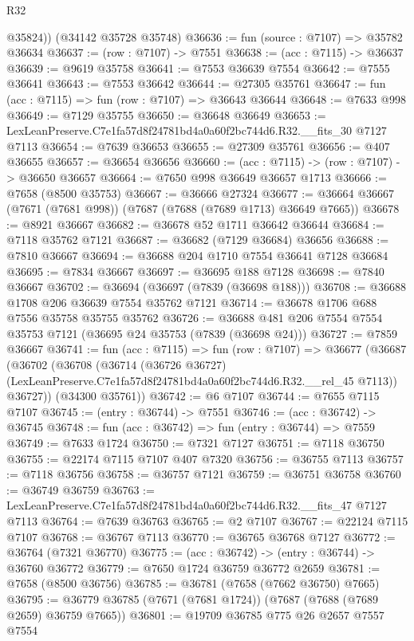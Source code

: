 \begin{lexlean}{R32}
\begin{coremodule}
        @35824))
    (@34142 @35728 @35748)
@36636 := fun (source : @7107) => @35782 @36634
@36637 := (row : @7107) -> @7551
@36638 := (acc : @7115) -> @36637
@36639 := @9619 @35758
@36641 := @7553 @36639 @7554
@36642 := @7555 @36641
@36643 := @7553 @36642
@36644 := @27305 @35761
@36647 := fun (acc : @7115) => fun (row : @7107) => @36643 @36644
@36648 := @7633 @998
@36649 := @7129 @35755
@36650 := @36648 @36649
@36653 := LexLeanPreserve.C7e1fa57d8f24781bd4a0a60f2bc744d6.R32.__fits_30 @7127 @7113
@36654 := @7639 @36653
@36655 := @27309 @35761
@36656 := @407 @36655
@36657 := @36654 @36656
@36660 := (acc : @7115) -> (row : @7107) -> @36650 @36657
@36664 := @7650 @998 @36649 @36657 @1713
@36666 := @7658 (@8500 @35753)
@36667 := @36666 @27324
@36677 := @36664 @36667 (@7671 (@7681 @998)) (@7687 (@7688 (@7689 @1713) @36649 @7665))
@36678 := @8921 @36667
@36682 := @36678 @52 @1711 @36642 @36644
@36684 := @7118 @35762 @7121
@36687 := @36682 (@7129 @36684) @36656
@36688 := @7810 @36667
@36694 := @36688 @204 @1710 @7554 @36641 @7128 @36684
@36695 := @7834 @36667
@36697 := @36695 @188 @7128
@36698 := @7840 @36667
@36702 := @36694 (@36697 (@7839 (@36698 @188)))
@36708 := @36688 @1708 @206 @36639 @7554 @35762 @7121
@36714 := @36678 @1706 @688 @7556 @35758 @35755 @35762
@36726 := @36688 @481 @206 @7554 @7554 @35753 @7121 (@36695 @24 @35753 (@7839 (@36698 @24)))
@36727 := @7859 @36667
@36741 := fun (acc : @7115) =>
  fun (row : @7107) =>
  @36677
    (@36687
      (@36702
        (@36708
          (@36714
            (@36726 @36727)
            (LexLeanPreserve.C7e1fa57d8f24781bd4a0a60f2bc744d6.R32.__rel_45 @7113))
          @36727))
      (@34300 @35761))
@36742 := @6 @7107
@36744 := @7655 @7115 @7107
@36745 := (entry : @36744) -> @7551
@36746 := (acc : @36742) -> @36745
@36748 := fun (acc : @36742) => fun (entry : @36744) => @7559
@36749 := @7633 @1724
@36750 := @7321 @7127
@36751 := @7118 @36750
@36755 := @22174 @7115 @7107 @407 @7320
@36756 := @36755 @7113
@36757 := @7118 @36756
@36758 := @36757 @7121
@36759 := @36751 @36758
@36760 := @36749 @36759
@36763 := LexLeanPreserve.C7e1fa57d8f24781bd4a0a60f2bc744d6.R32.__fits_47 @7127 @7113
@36764 := @7639 @36763
@36765 := @2 @7107
@36767 := @22124 @7115 @7107
@36768 := @36767 @7113
@36770 := @36765 @36768 @7127
@36772 := @36764 (@7321 @36770)
@36775 := (acc : @36742) -> (entry : @36744) -> @36760 @36772
@36779 := @7650 @1724 @36759 @36772 @2659
@36781 := @7658 (@8500 @36756)
@36785 := @36781 (@7658 (@7662 @36750) @7665)
@36795 := @36779 @36785 (@7671 (@7681 @1724)) (@7687 (@7688 (@7689 @2659) @36759 @7665))
@36801 := @19709 @36785 @775 @26 @2657 @7557 @7554

\end{coremodule}
\end{lexlean}
